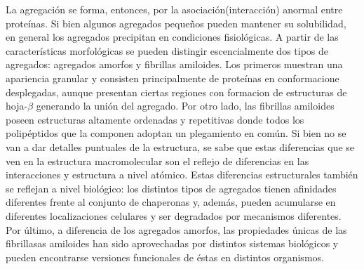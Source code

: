 La agregación se forma, entonces, por la asociación(interacción) anormal entre proteínas.
Si bien algunos agregados pequeños pueden mantener su solubilidad, en general los agregados precipitan en condiciones fisiológicas. 
A partir de las características morfológicas se pueden distingir escencialmente dos tipos de agregados: agregados amorfos y fibrillas amiloides.
Los primeros muestran una apariencia granular y consisten principalmente de proteínas en conformacione desplegadas, 
aunque presentan ciertas regiones con formacion de estructuras de hoja-$\beta$ generando la unión del agregado.
Por otro lado, las fibrillas amiloides poseen estructuras altamente ordenadas y repetitivas donde todos los polipéptidos que la componen adoptan un plegamiento en común.
Si bien no se van a dar detalles puntuales de la estructura, se sabe que estas diferencias que se ven en la estructura macromolecular son el reflejo de diferencias en las interacciones y estructura a nivel atómico.
Estas diferencias estructurales también se reflejan a nivel biológico: los distintos tipos de agregados tienen afinidades diferentes frente al conjunto de chaperonas y, además, 
pueden acumularse en diferentes localizaciones celulares y ser degradados por mecanismos diferentes.
Por último, a diferencia de los agregados amorfos, las propiedades únicas de las fibrillasas 
amiloides han sido aprovechadas por distintos sistemas biológicos y pueden encontrarse versiones funcionales de éstas en distintos organismos\cite{fowler2007functional}.



